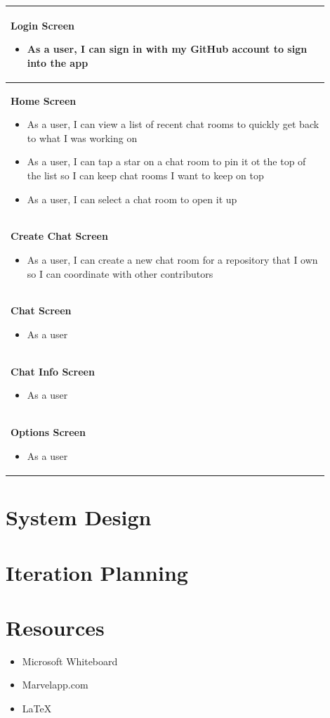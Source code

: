 \documentclass{report}
\begin{document}
\begin{center}
    \begin{tabular}{ | p{0.9\linewidth} |}
        \hline
        \textbf{Login Screen} \begin{itemize}
            \item As a user, I can sign in with my GitHub account to sign into the app
        \end{itemize}\\
        \hline
        \textbf{Home Screen} \begin{itemize}
            \item As a user, I can view a list of recent chat rooms to quickly get back to what I was working on
            \item As a user, I can tap a star on a chat room to pin it ot the top of the list so I can keep chat rooms I want to keep on top
            \item As a user, I can select a chat room to open it up
        \end{itemize}\\
        \hline
        \textbf{Create Chat Screen}\begin{itemize}
            \item As a user, I can create a new chat room for a repository that I own so I can coordinate with other contributors
        \end{itemize}\\
        \hline
        \textbf{Chat Screen}\begin{itemize}
            \item As a user
        \end{itemize}\\
        \hline
        \textbf{Chat Info Screen}\begin{itemize}
            \item As a user
        \end{itemize}\\
        \hline
        \textbf{Options Screen}\begin{itemize}
            \item As a user
        \end{itemize}\\
        \hline
    \end{tabular}
\end{center}

\chapter{System Design}

\chapter{Iteration Planning}

\appendix
\chapter{Resources}

\begin{itemize}
    \item Microsoft Whiteboard
    \item Marvelapp.com
    \item \LaTeX
\end{itemize}
\end{document}
